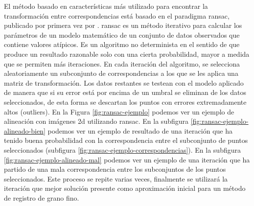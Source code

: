 El método basado en características más utilizado para encontrar la transformación entre correspondencias está basado en el paradigma \gls{ransac}, publicado por primera vez por \cite{Fischler1981}.
\gls{ransac} es un método iterativo para calcular los parámetros de un modelo matemático de un conjunto de datos observados que contiene valores atípicos.
Es un algoritmo no determinista en el sentido de que produce un resultado razonable solo con una cierta probabilidad, mayor a medida que se permiten más iteraciones.
En cada iteración del algoritmo, se selecciona aleatoriamente un subconjunto de correspondencias a los que se les aplica una matriz de transformación.
Los datos restantes se testean con el modelo aplicado de manera que si su error está por encima de un umbral se eliminan de los datos seleccionados, de esta forma se descartan los puntos con errores extremadamente altos (outliers).
En la Figura \ref{fig:ransac-ejemplo} podemos ver un ejemplo de alineación con imágenes \gls{2d} utilizando \gls{ransac}.
En la subfigura \ref{fig:ransac-ejemplo-alineado-bien} podemos ver un ejemplo de resultado de una iteración que ha tenido buena probabilidad con la correspondencia entre el subconjunto de puntos seleccionados (subfigura \ref{fig:ransac-ejemplo-correspondencias}).
En la subfigura \ref{fig:ransac-ejemplo-alineado-mal} podemos ver un ejemplo de una iteración que ha partido de una mala correspondencia entre los subconjuntos de los puntos seleccionados.
Este proceso se repite varias veces, finalmente se utilizará la iteración que mejor solución presente como aproximación inicial para un método de registro de grano fino.

